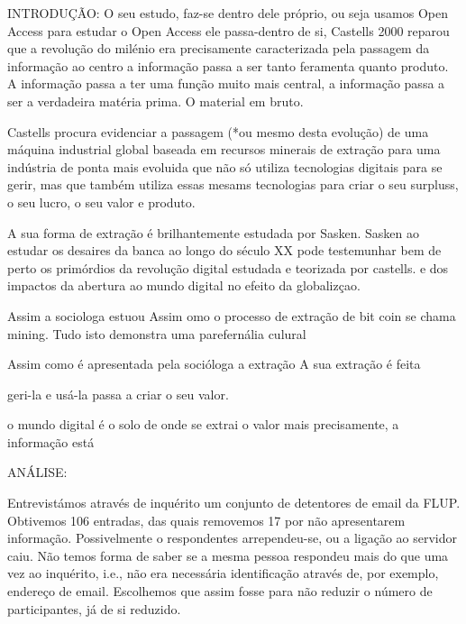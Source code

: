 INTRODUÇÃO:
O seu estudo,
faz-se dentro dele próprio,
ou seja
usamos Open Access para estudar o Open Access
ele passa-dentro de si,
Castells 2000 reparou que a revolução do milénio era precisamente caracterizada pela passagem da informação 
ao centro
a informação passa a ser
tanto feramenta quanto produto.
A informação passa a ter uma função
muito mais central,
a informação passa a ser
a verdadeira matéria prima.
O material em bruto.

Castells procura evidenciar a passagem (*ou mesmo desta evolução)  de uma máquina industrial global baseada em recursos minerais de extração para uma indústria de ponta mais evoluida que não só utiliza tecnologias digitais para se gerir, mas que também utiliza essas mesams tecnologias para criar o seu surpluss, o seu lucro, o seu valor e produto.

A sua forma de extração é brilhantemente estudada por Sasken. 
Sasken ao estudar os desaires da banca ao longo do século XX pode testemunhar bem de perto os primórdios
da revolução digital estudada e teorizada por castells.
e dos impactos da abertura ao mundo digital no efeito da globalizçao.

Assim a sociologa estuou
Assim omo o processo de extração de bit coin se chama mining. Tudo isto demonstra uma parefernália culural 


Assim como é apresentada pela socióloga a extração 
A sua extração é feita 

geri-la e usá-la passa a criar o seu valor.

o mundo digital é 
o solo de onde se extrai o valor
mais precisamente,
a informação está 

ANÁLISE:

Entrevistámos através de inquérito um conjunto de detentores de email da FLUP. Obtivemos 106 entradas, das quais removemos 17 por não apresentarem informação. Possivelmente o respondentes arrependeu-se, ou a ligação ao servidor caiu. Não temos forma de saber se a mesma pessoa respondeu mais do que uma vez ao inquérito, i.e., não era necessária identificação através de, por exemplo, endereço de email. Escolhemos que assim fosse para não reduzir o número de participantes, já de si reduzido. 

